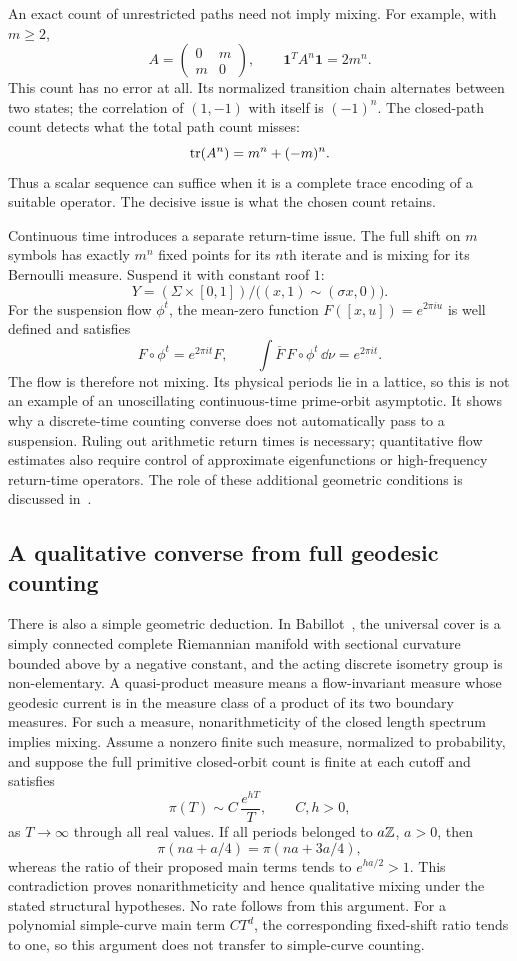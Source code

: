 An exact count of unrestricted paths need not imply mixing.
For example, with $m\geq2$,
\[
 A=\begin{pmatrix}0&m\\m&0\end{pmatrix},
 \qquad \mathbf1^T A^n\mathbf1=2m^n.
\]
This count has no error at all. Its normalized transition chain
alternates between two states; the correlation of $(1,-1)$ with
itself is $(-1)^n$. The closed-path count detects what the total
path count misses:
\[
 \operatorname{tr}(A^n)=m^n+(-m)^n.
\]
Thus a scalar sequence can suffice when it is a complete trace
encoding of a suitable operator. The decisive issue is what the
chosen count retains.

Continuous time introduces a separate return-time issue. The full
shift on $m$ symbols has exactly $m^n$ fixed points for its $n$th
iterate and is mixing for its Bernoulli measure. Suspend it with
constant roof $1$:
\[
 Y=(\Sigma\times[0,1])/
       \bigl((x,1)\sim(\sigma x,0)\bigr).
\]
For the suspension flow $\phi^t$, the mean-zero function
$F([x,u])=e^{2\pi i u}$ is well defined and satisfies
\[
 F\circ\phi^t=e^{2\pi it}F,\qquad
 \int\overline F\,F\circ\phi^t\,\dd\nu=e^{2\pi it}.
\]
The flow is therefore not mixing. Its physical periods lie in a
lattice, so this is not an example of an unoscillating continuous-time
prime-orbit asymptotic. It shows why a discrete-time counting converse
does not automatically pass to a suspension. Ruling out arithmetic
return times is necessary; quantitative flow estimates also require
control of approximate eigenfunctions or high-frequency return-time
operators. The role of these additional geometric conditions is
discussed in~\cite{DolgopyatMixing}.

\subsection{A qualitative converse from full geodesic counting}

There is also a simple geometric deduction. In
Babillot~\cite[Theorem~1]{BabillotMixing},
the universal cover is a simply connected complete Riemannian manifold
with sectional curvature bounded above by a negative constant, and
the acting discrete isometry group is non-elementary. A quasi-product
measure means a flow-invariant measure whose geodesic current is in the
measure class of a product of its two boundary measures. For such a
measure, nonarithmeticity of the closed length spectrum implies mixing.
Assume a nonzero finite such measure, normalized to probability,
and suppose the full
primitive closed-orbit count is finite at each cutoff and satisfies
\[
 \pi(T)\sim C\,\frac{e^{hT}}{T},\qquad C,h>0,
\]
as $T\longrightarrow\infty$ through all real values. If all periods
belonged to $a\mathbb Z$, $a>0$, then
\[
 \pi(na+a/4)=\pi(na+3a/4),
\]
whereas the ratio of their proposed main terms tends to $e^{ha/2}>1$.
This contradiction proves nonarithmeticity and hence qualitative
mixing under the stated structural hypotheses. No rate follows from
this argument. For a polynomial simple-curve main term $CT^d$,
the corresponding fixed-shift ratio tends to one, so this argument
does not transfer to simple-curve counting.

